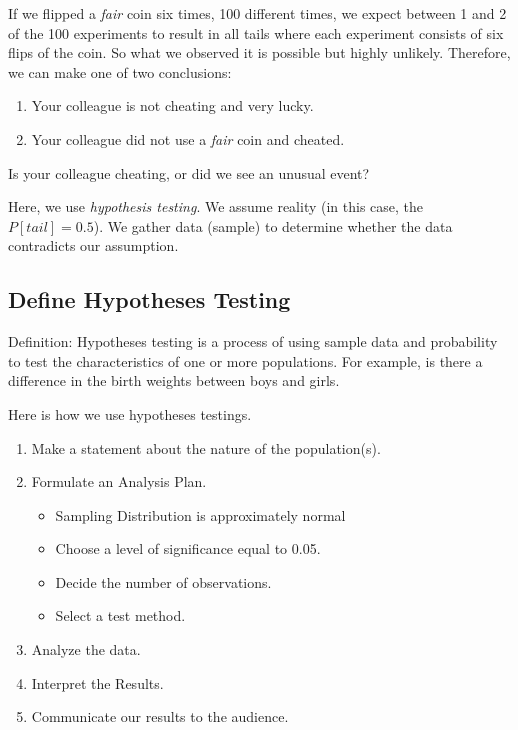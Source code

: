 \documentclass[11pt, chapterprefix=true]{scrbook}\usepackage[]{graphicx}\usepackage[]{color}
\begin{document}
If we flipped a \textit{fair} coin six times, 100 different times, we expect between 1 and 2 of the 100 experiments to result in all tails where each experiment consists of six flips of the coin.  So what we observed it is possible but highly unlikely.  Therefore, we can make one of two conclusions:

\begin{enumerate}
\item Your colleague is not cheating and very lucky.
\item Your colleague did not use a \textit{fair} coin and cheated.
\end{enumerate}

Is your colleague cheating, or did we see an unusual event?

Here, we use \textit{hypothesis testing}.  We assume reality (in this case, the $P[tail] = 0.5$).  We gather data (sample) to determine whether the data contradicts our assumption.

\subsection{Define Hypotheses Testing}

Definition: Hypotheses testing is a process of using sample data and probability to test the characteristics of one or more populations.  For example, is there a difference in the birth weights between boys and girls.

Here is how we use hypotheses testings.

\begin{enumerate}
\item Make a statement about the nature of the population(s).
\item Formulate an Analysis Plan. 

  \begin{itemize}
  \item Sampling Distribution is approximately normal
  \item Choose a level of significance equal to 0.05.
  \item Decide the number of observations.
  \item Select a test method.
  \end{itemize}

\item Analyze the data.
\item Interpret the Results.
\item Communicate our results to the audience.
\end{enumerate}
\end{document}

